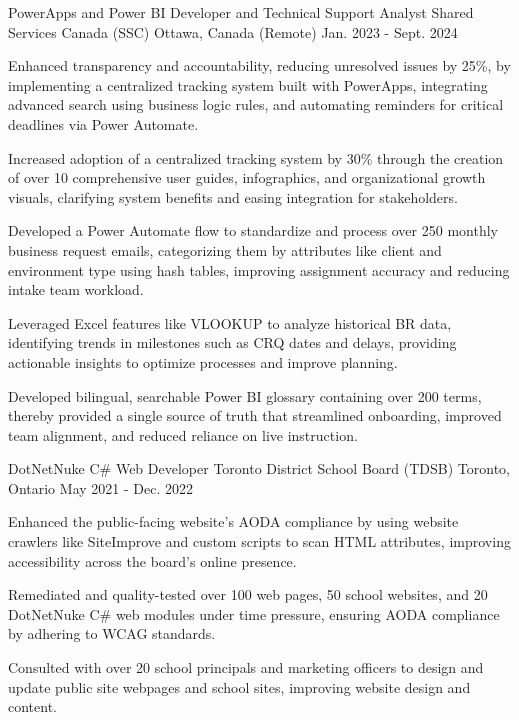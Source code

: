 \begin{cventries}
\cventry
  {PowerApps and Power BI Developer and Technical Support Analyst} %
  {Shared Services Canada (SSC)} %
  {Ottawa, Canada (Remote)} %
  {Jan. 2023 - Sept. 2024} %
  { %
    \begin{cvitems}
      \item {Enhanced transparency and accountability, reducing unresolved issues by 25\%, by implementing a centralized tracking system built with PowerApps, integrating advanced search using business logic rules, and automating reminders for critical deadlines via Power Automate.}
      \item {Increased adoption of a centralized tracking system by 30\% through the creation of over 10 comprehensive user guides, infographics, and organizational growth visuals, clarifying system benefits and easing integration for stakeholders.}
      \item {Developed a Power Automate flow to standardize and process over 250 monthly business request emails, categorizing them by attributes like client and environment type using hash tables, improving assignment accuracy and reducing intake team workload.}
      \item {Leveraged Excel features like VLOOKUP to analyze historical BR data, identifying trends in milestones such as CRQ dates and delays, providing actionable insights to optimize processes and improve planning.}
      \item {Developed bilingual, searchable Power BI glossary containing over 200 terms, thereby provided a single source of truth that streamlined onboarding, improved team alignment, and reduced reliance on live instruction.}
    \end{cvitems}
  }

\cventry
  {DotNetNuke C\# Web Developer} %
  {Toronto District School Board (TDSB)} %
  {Toronto, Ontario} %
  {May 2021 - Dec. 2022} %
  { %
    \begin{cvitems}
      \item {Enhanced the public-facing website's AODA compliance by using website crawlers like SiteImprove and custom scripts to scan HTML attributes, improving accessibility across the board's online presence.}
      \item {Remediated and quality-tested over 100 web pages, 50 school websites, and 20 DotNetNuke C\# web modules under time pressure, ensuring AODA compliance by adhering to WCAG standards.}
      \item {Consulted with over 20 school principals and marketing officers to design and update public site webpages and school sites, improving website design and content.}
    \end{cvitems}
  }


\end{cventries}
